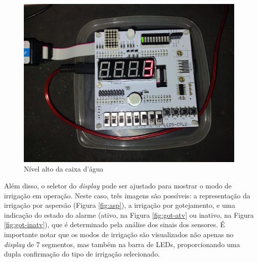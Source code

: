 \documentclass[
	article,			%
	11pt,				%
	oneside,			%
	a4paper,			%
	english,			%
	brazil,				%
	sumario=tradicional
	]{abntex2}
\begin{document}
\begin{figure}[H]
    \centering
    \includegraphics[width=0.5\linewidth]{high.png}
    \caption{Nível alto da caixa d'água}
    \label{fig:high}
\end{figure}

Além disso, o seletor do \textit{display} pode ser ajustado para mostrar o modo de irrigação em operação. Neste caso, três imagens são possíveis: a representação da irrigação por aspersão (Figura \ref{fig:asp}), a irrigação por gotejamento, e uma indicação do estado do alarme (ativo, na Figura \ref{fig:got-atv} ou inativo, na Figura \ref{fig:got-inatv}), que é determinado pela análise dos sinais dos sensores. É importante notar que os modos de irrigação são visualizados não apenas no \textit{display} de 7 segmentos, mas também na barra de LEDs, proporcionando uma dupla confirmação do tipo de irrigação selecionado.
\end{document}
